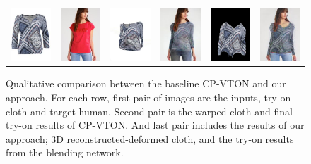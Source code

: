 \begin{figure}[t]
\begin{tabular}{cc|cc|cc}
\includegraphics[width=2cm]{figures/cloth/016962_1.jpg}&
\includegraphics[width=2cm]{figures/image/019402_0.jpg}&
\includegraphics[width=2cm]{figures/cp-vton/warp-cloth/016962_1_019402_0.jpg}&
\includegraphics[width=2cm]{figures/cp-vton/try-on/016962_1_019402_0.jpg}&
\includegraphics[width=2cm]{figures/c3dwfull/016962_1_019402_0.png}&
\includegraphics[width=2cm]{figures/try-on/016962_1_019402_0.jpg}\\

\end{tabular}

    \caption{Qualitative comparison between the baseline CP-VTON\cite{Wang2018TowardCI} and our approach. For each row, first pair of images are the inputs, try-on cloth and target human. Second pair is the warped cloth and final try-on results of CP-VTON\cite{Wang2018TowardCI}. And last pair includes the results of our approach; 3D reconstructed-deformed cloth, and the try-on results from the blending network.}
    \label{fig:testresults}
\end{figure}



